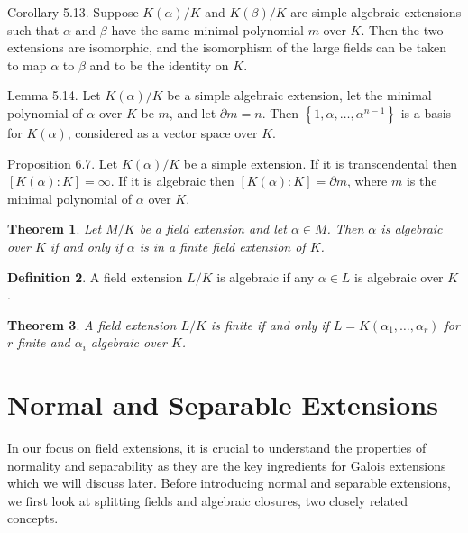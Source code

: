 \documentclass[12pt]{article}
\newtheorem{theorem}{Theorem}
\theoremstyle{definition}
\newtheorem{definition}[theorem]{Definition}
\begin{document}

Corollary 5.13. Suppose $K(\alpha) / K$ and $K(\beta) / K$ are simple algebraic extensions such that $\alpha$ and $\beta$ have the same minimal polynomial $m$ over $K$. Then the two extensions are isomorphic, and the isomorphism of the large fields can be taken to map $\alpha$ to $\beta$ and to be the identity on $K$.

Lemma 5.14. Let $K(\alpha) / K$ be a simple algebraic extension, let the minimal polynomial of $\alpha$ over $K$ be $m$, and let $\partial m=n$. Then $\left\{1, \alpha, \ldots, \alpha^{n-1}\right\}$ is a basis for $K(\alpha)$, considered as a vector space over $K$.

Proposition 6.7. Let $K(\alpha) / K$ be a simple extension. If it is transcendental then $[K(\alpha): K]=\infty$. If it is algebraic then $[K(\alpha): K]=\partial m$, where $m$ is the minimal polynomial of $\alpha$ over $K$.


\begin{theorem}
    Let $M/K$ be a field extension and let $\alpha \in M$. Then $\alpha$ is algebraic over $K$ if and only if $\alpha$ is in a finite field extension of $K$. 
\end{theorem}

\begin{definition}
    A field extension $L/K$ is algebraic if any $\alpha \in L$ is algebraic over $K$. 
\end{definition}

\begin{theorem} \label{thm:finite-equi-def}
    A field extension $L/K$ is finite if and only if $L = K(\alpha_1, \dots, \alpha_r)$ for $r$ finite and $\alpha_i$ algebraic over $K$. 
\end{theorem}






\section{Normal and Separable Extensions}
In our focus on field extensions, it is crucial to understand the properties of normality and separability as they are the key ingredients for Galois extensions which we will discuss later. Before introducing normal and separable extensions, we first look at splitting fields and algebraic closures, two closely related concepts. 
\end{document}
